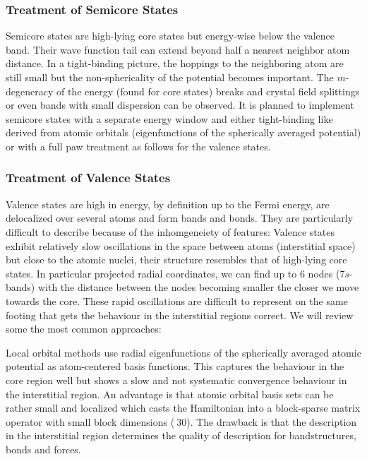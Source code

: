 \documentclass[oribibl]{llncs}
\begin{document}
\subsubsection{Treatment of Semicore States}
Semicore states are high-lying core states
but energy-wise below the valence band.
Their wave function tail can extend beyond half a nearest neighbor atom distance.
In a tight-binding picture, the hoppings to the neighboring atom are still small
but the non-sphericality of the potential becomes important.
The $m$-degeneracy of the energy (found for core states) breaks 
and crystal field splittings or even bands with small dispersion can be observed.
It is planned to implement semicore states with a separate energy window
and either tight-binding like derived from atomic orbitals 
(eigenfunctions of the spherically averaged potential) 
or with a full \ac{paw} treatment as follows for the valence states.

\subsubsection{Treatment of Valence States}
Valence states are high in energy, by definition up to the Fermi
energy, are delocalized over several atoms and form bands and bonds.
They are particularly difficult to describe because of the 
inhomgeneiety of features:
Valence states exhibit relatively slow oscillations 
in the space between atoms (interstitial space) but close to the atomic nuclei,
their structure resembles that of high-lying core states.
In particular projected radial coordinates, we can find up to $6$ nodes
(7$s$-bands) with the distance between the nodes becoming smaller
the closer we move towards the core.
These rapid oscillations are difficult to represent
on the same footing that gets the behaviour in the interstitial regions correct. 
We will review some the most common approaches:

Local orbital methods use radial eigenfunctions 
of the spherically averaged atomic potential as atom-centered basis functions.
This captures the behaviour in the core region well
but shows a slow and not systematic convergence behaviour in the interstitial region. 
An advantage is that atomic orbital basis sets can be rather small
and localized which casts the Hamiltonian into a block-sparse matrix operator with small block dimensions ($~ 30$).
The drawback is that the description in the interstitial region determines the
quality of description for bandstructures, bonds and forces.
\end{document}
